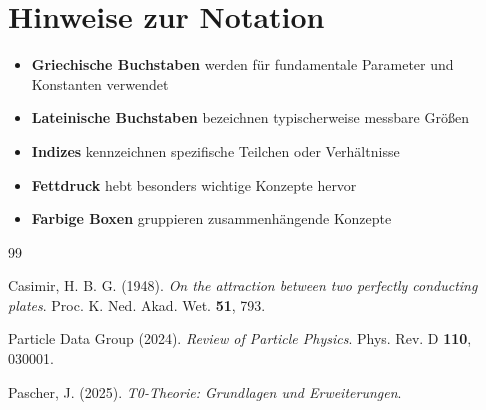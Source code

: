 	\section*{Hinweise zur Notation}
	
	\begin{itemize}
		\item \textbf{Griechische Buchstaben} werden für fundamentale Parameter und Konstanten verwendet
		\item \textbf{Lateinische Buchstaben} bezeichnen typischerweise messbare Größen
		\item \textbf{Indizes} kennzeichnen spezifische Teilchen oder Verhältnisse
		\item \textbf{Fettdruck} hebt besonders wichtige Konzepte hervor
		\item \textbf{Farbige Boxen} gruppieren zusammenhängende Konzepte
	\end{itemize}
	
	\begin{thebibliography}{99}
		
		Casimir, H. B. G. (1948). \textit{On the attraction between two perfectly conducting plates}.
		Proc. K. Ned. Akad. Wet. \textbf{51}, 793.
		
		Particle Data Group (2024). \textit{Review of Particle Physics}.
		Phys. Rev. D \textbf{110}, 030001.
		
		Pascher, J. (2025). \textit{T0-Theorie: Grundlagen und Erweiterungen}.

	\end{thebibliography}
	